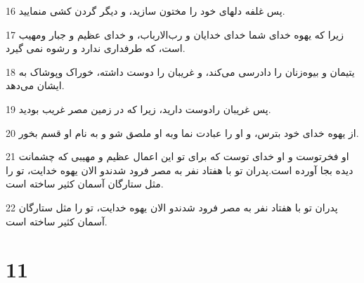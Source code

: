 \par 16 پس غلفه دلهای خود را مختون سازید، و دیگر گردن کشی منمایید.
\par 17 زیرا که یهوه خدای شما خدای خدایان و رب‌الارباب، و خدای عظیم و جبار ومهیب است، که طرفداری ندارد و رشوه نمی گیرد. 
\par 18 یتیمان و بیوه‌زنان را دادرسی می‌کند، و غریبان را دوست داشته، خوراک وپوشاک به ایشان می‌دهد.
\par 19 پس غریبان رادوست دارید، زیرا که در زمین مصر غریب بودید.
\par 20 از یهوه خدای خود بترس، و او را عبادت نما وبه او ملصق شو و به نام او قسم بخور.
\par 21 او فخرتوست و او خدای توست که برای تو این اعمال عظیم و مهیبی که چشمانت دیده بجا آورده است.پدران تو با هفتاد نفر به مصر فرود شدندو الان یهوه خدایت، تو را مثل ستارگان آسمان کثیر ساخته است.
\par 22 پدران تو با هفتاد نفر به مصر فرود شدندو الان یهوه خدایت، تو را مثل ستارگان آسمان کثیر ساخته است.
 
\chapter{11}

